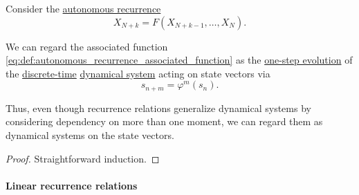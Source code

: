 \begin{proposition}\label{thm:autonomous_recurrence_as_dynamical_system}
  Consider the \hyperref[def:recurrence_relation/autonomous]{autonomous recurrence}
  \begin{equation*}
    X_{N+k} = F(X_{N+k-1}, \ldots, X_N).
  \end{equation*}

  We can regard the associated function \eqref{eq:def:autonomous_recurrence_associated_function} as the \hyperref[def:one_step_evolution_function]{one-step evolution} of the \hyperref[def:discrete_dynamical_system]{discrete-time} \hyperref[def:dynamical_system]{dynamical system} acting on state vectors via
  \begin{equation*}
    s_{n+m} = \varphi^m(s_n).
  \end{equation*}
\end{proposition}
\begin{comments}
  \item Thus, even though recurrence relations generalize dynamical systems by considering dependency on more than one moment, we can regard them as dynamical systems on the state vectors.
\end{comments}
\begin{proof}
  Straightforward induction.
\end{proof}

\paragraph{Linear recurrence relations}

